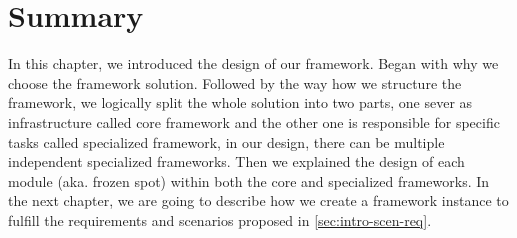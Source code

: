 \section{Summary}
\label{sec:fw-design-summary}

In this chapter, we introduced the design of our framework. Began with why
we choose the framework solution. Followed by the way how we
structure the framework, we logically split the whole solution into two parts,
one sever as infrastructure called core framework and the other one is
responsible for specific tasks called specialized framework, in our design,
there can be multiple independent specialized frameworks.
Then we explained the design of each module (aka. frozen spot) within both the
core and specialized frameworks. In the next chapter, we are going to describe
how we create a framework instance to fulfill the requirements and scenarios
proposed in \autoref{sec:intro-scen-req}.

